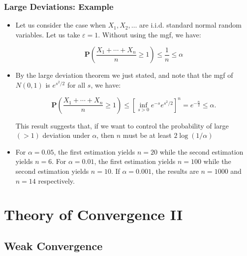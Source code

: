 \documentclass[handout]{beamer}
\newcommand{\BP}{\mathbf{P}}
\begin{document}
\frame
{
  \frametitle{Large Deviations: Example} 

   \begin{itemize}

                 \item<1-> Let us consider the case when $X_1, X_2,\ldots$ are i.i.d. standard normal random variables. Let us take $\varepsilon=1$. Without using the mgf, we have:
                 
      $$\BP(\frac{X_1+\cdots+X_n}{n}\geq 1)\leq  \frac{1}{  n} \le \alpha$$

                 \item<2-> By the large deviation theorem we just stated, and note that the mgf of  $N(0,1)$ is $e^{s^2/2}$ for all $s$, we have:
                 
                       $$\BP\left(\frac{X_1+\cdots+X_n}{n}\geq 1 \right)\leq  [\inf_{s>0} e^{-s} e^{s^2/2}]^n=e^{-\frac{n }{2}} \le \alpha.$$
                       
                       This result suggests that, if we want to control the probability of large $(>1)$ deviation under $\alpha$, then $n$ must be at least $2\log (1/\alpha)$



                 \item<3-> For $\alpha=0.05$, the first estimation yields $n=20$ while the second estimation yields $n=6$. For $\alpha=0.01$, the first estimation yields $n=100$ while the second estimation yields $n=10$.  If $\alpha=0.001$, the results are $n=1000$ and $n=14$ respectively. 
                            \end{itemize}
}

\section{Theory of Convergence II}
\subsection{Weak Convergence}
\end{document}
